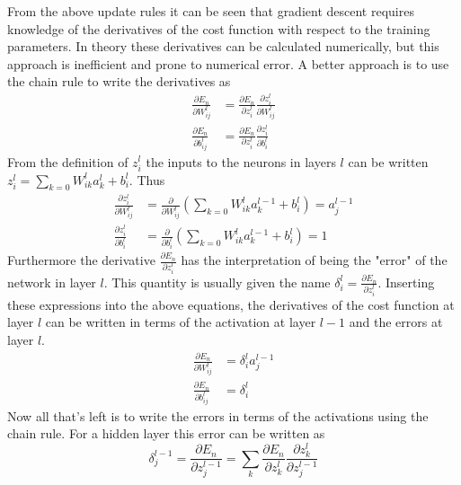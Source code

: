 \documentclass{article}
\begin{document}
From the above update rules it can be seen that gradient descent requires knowledge of the derivatives of the cost function with respect to the training parameters. In theory these derivatives can be calculated numerically, but this approach is inefficient and prone to numerical error. A better approach is to use the chain rule to write the derivatives as
\begin{equation}
\begin{split}
\frac{\partial E_n}{\partial W^l_{ij}} &= \frac{\partial E_n}{\partial z_i^l } \frac{\partial z_i^l}{\partial W^l_{ij}} \\
\frac{\partial E_n}{\partial b^l_{ij}} &= \frac{\partial E_n}{\partial z_i^l} \frac{\partial z_i^l}{\partial b^l_i}
\end{split}
\end{equation}
From the definition of $z_i^l$ the inputs to the neurons in layers $l$ can be written $z_i^l=\sum_{k=0} W_{ik}^l a_k^l + b_i^l$. Thus
\begin{equation}
\begin{split}
\frac{\partial z_i^l}{\partial W^l_{ij}} &= \frac{\partial}{\partial W^l_{ij}} \left( \sum_{k=0} W_{ik}^l a_k^{l-1} + b_i^l \right) = a_j^{l-1} \\
\frac{\partial z_i^l}{\partial b^l_i} &= \frac{\partial}{\partial b^l_{i}} \left( \sum_{k=0} W_{ik}^l a_k^{l-1} + b_i^l \right) = 1
\end{split}
\end{equation}
Furthermore the derivative $\frac{\partial E_n}{\partial z_i^l }$ has the interpretation of being the "error" of the network in layer $l$. This quantity is usually given the name $\delta_i^l = \frac{\partial E_n}{\partial z_i^l }$. Inserting these expressions into the above equations, the derivatives of the cost function at layer $l$ can be written in terms of the activation at layer $l-1$ and the errors at layer $l$.
\begin{equation}
\begin{split}
\frac{\partial E_n}{\partial W^l_{ij}} &= \delta_i^l a_j^{l-1} \\
\frac{\partial E_n}{\partial b^l_{ij}} &= \delta_i^l
\end{split}
\end{equation}
Now all that's left is to write the errors in terms of the activations using the chain rule. For a hidden layer this error can be written as
\begin{equation}
\delta_j^{l-1} = \frac{\partial E_n}{\partial z_j^{l-1} } = \sum_k \frac{\partial E_n}{\partial z_k^l } \frac{\partial z_k^l}{\partial z_j^{l-1} }
\end{equation}
\end{document}
